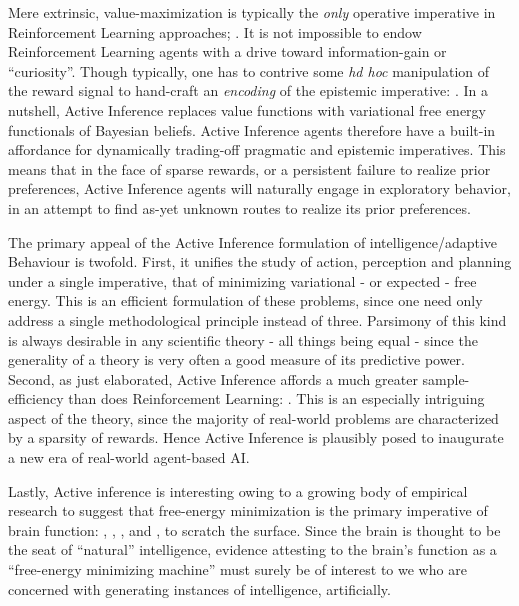 \documentclass[onecolumn]{IEEEtran}
\begin{document}
Mere extrinsic, value-maximization is typically the \textit{only} operative imperative in Reinforcement Learning approaches; \textcite{Reinforcement-Learning-An-Introduction}. It is not impossible to endow Reinforcement Learning agents with a drive toward information-gain or ``curiosity''. Though typically, one has to contrive some \textit{hd hoc} manipulation of the reward signal to hand-craft an \textit{encoding} of the epistemic imperative: \textcite{Curiosity-Driven-RL}. In a nutshell, Active Inference replaces value functions with variational free energy functionals of Bayesian beliefs. Active Inference agents therefore have a built-in affordance for dynamically trading-off pragmatic and epistemic imperatives. This means that in the face of sparse rewards, or a persistent failure to realize prior preferences, Active Inference agents will naturally engage in exploratory behavior, in an attempt to find as-yet unknown routes to realize its prior preferences. 

The primary appeal of the Active Inference formulation of intelligence/adaptive Behaviour is twofold. First, it unifies the study of action, perception and planning under a single imperative, that of minimizing variational - or expected - free energy. This is an efficient formulation of these problems, since one need only address a single methodological principle instead of three. Parsimony of this kind is always desirable in any scientific theory - all things being equal - since the generality of a theory is very often a good measure of its predictive power. Second, as just elaborated, Active Inference affords a much greater sample-efficiency than does Reinforcement Learning: \textcite{Scaling-AIF}. This is an especially intriguing aspect of the theory, since the majority of real-world problems are characterized by a sparsity of rewards. Hence Active Inference is plausibly posed to inaugurate a new era of real-world agent-based AI.

Lastly, Active inference is interesting owing to a growing body of empirical research to suggest that free-energy minimization is the primary imperative of brain function: \textcite{FEP-Rough-Guide-Brain}, \textcite{The-Bayesian-Brain}, \textcite{Active-Inference-Book}, \textcite{Neural-Dynamics-AIF} and \textcite{AIF-A-Process-Theory}, to scratch the surface. Since the brain is thought to be the seat of ``natural'' intelligence, evidence attesting to the brain's function as a ``free-energy minimizing machine'' must surely be of interest to we who are concerned with generating instances of intelligence, artificially.
\end{document}
